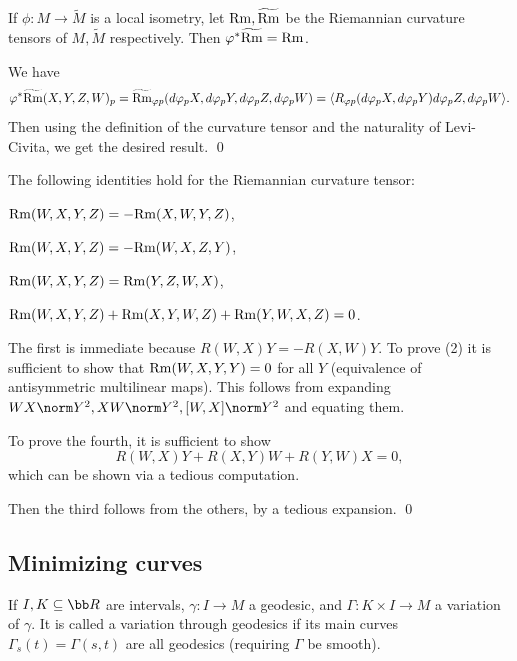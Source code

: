 \bprop

    If $\phi\colon M\to\tilde M$ is a local isometry, let ${\rm Rm},\widetilde{{\rm Rm}}$ be the Riemannian curvature tensors of $M,\tilde M$
    respectively.
    Then $\varphi^*\widetilde{{\rm Rm}}={\rm Rm}$.

\eprop

\bproof

    We have
    $$ \varphi^*\widetilde{{\rm Rm}}(X,Y,Z,W)_p = \widetilde{{\rm Rm}}_{\varphi p}(d\varphi_pX,d\varphi_pY,d\varphi_pZ,d\varphi_pW)
    = \mathopen{}\mathclose{\left<R_{\varphi p}(d\varphi_pX,d\varphi_pY)d\varphi_pZ,d\varphi_pW\right>} . $$
    Then using the definition of the curvature tensor and the naturality of Levi-Civita, we get the desired result.
    \qed

\eproof

\bprop

    The following identities hold for the Riemannian curvature tensor:
    \benum
        \item ${\rm Rm}(W,X,Y,Z)=-{\rm Rm}(X,W,Y,Z)$,
        \item ${\rm Rm}(W,X,Y,Z)=-{\rm Rm}(W,X,Z,Y)$,
        \item ${\rm Rm}(W,X,Y,Z)={\rm Rm}(Y,Z,W,X)$,
        \item ${\rm Rm}(W,X,Y,Z)+{\rm Rm}(X,Y,W,Z)+{\rm Rm}(Y,W,X,Z)=0$.
    \eenum

\eprop

\bproof

    The first is immediate because $R(W,X)Y=-R(X,W)Y$.
    To prove (2) it is sufficient to show that ${\rm Rm}(W,X,Y,Y)=0$ for all $Y$ (equivalence of antisymmetric multilinear
    maps).
    This follows from expanding $WX\norm Y^2,XW\norm Y^2,[W,X]\norm Y^2$ and equating them.

    To prove the fourth, it is sufficient to show
    $$ R(W,X)Y + R(X,Y)W + R(Y,W)X = 0 , $$
    which can be shown via a tedious computation.

    Then the third follows from the others, by a tedious expansion.
    \qed

\eproof

\subsection{Minimizing curves}

\bdefn

    If $I,K\subseteq\bR$ are intervals, $\gamma\colon I\to M$ a geodesic, and $\Gamma\colon K\times I\to M$ a variation of $\gamma$.
    It is called a {\emphcolor variation through geodesics} if its main curves $\Gamma_s(t)=\Gamma(s,t)$ are all geodesics
    (requiring $\Gamma$ be smooth).

